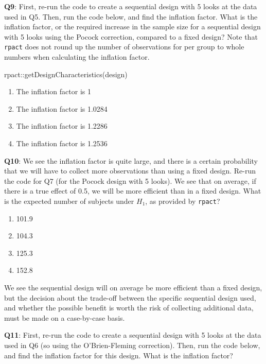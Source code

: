 \documentclass[
  oneside]{book}
\newenvironment{Shaded}{\begin{snugshade}}{\end{snugshade}}
\newcommand{\FunctionTok}[1]{\textcolor[rgb]{0.00,0.00,0.00}{#1}}
\newcommand{\NormalTok}[1]{#1}
\newcommand{\SpecialCharTok}[1]{\textcolor[rgb]{0.00,0.00,0.00}{#1}}
\providecommand{\tightlist}{%
  \setlength{\itemsep}{0pt}\setlength{\parskip}{0pt}}
\begin{document}
\textbf{Q9}: First, re-run the code to create a sequential design with 5 looks at the data used in Q5. Then, run the code below, and find the inflation factor. What is the inflation factor, or the required increase in the sample size for a sequential design with 5 looks using the Pocock correction, compared to a fixed design? Note that \texttt{rpact} does not round up the number of observations for per group to whole numbers when calculating the inflation factor.

\begin{Shaded}
\begin{Highlighting}[]
\NormalTok{rpact}\SpecialCharTok{::}\FunctionTok{getDesignCharacteristics}\NormalTok{(design)}
\end{Highlighting}
\end{Shaded}

\begin{enumerate}
\def\labelenumi{\Alph{enumi})}
\tightlist
\item
  The inflation factor is 1
\item
  The inflation factor is 1.0284
\item
  The inflation factor is 1.2286
\item
  The inflation factor is 1.2536
\end{enumerate}

\textbf{Q10}: We see the inflation factor is quite large, and there is a certain probability that we will have to collect more observations than using a fixed design. Re-run the code for Q7 (for the Pocock design with 5 looks). We see that on average, if there is a true effect of 0.5, we will be more efficient than in a fixed design. What is the expected number of subjects under \(H_1\), as provided by \texttt{rpact}?

\begin{enumerate}
\def\labelenumi{\Alph{enumi})}
\tightlist
\item
  101.9
\item
  104.3
\item
  125.3
\item
  152.8
\end{enumerate}

We see the sequential design will on average be more efficient than a fixed design, but the decision about the trade-off between the specific sequential design used, and whether the possible benefit is worth the risk of collecting additional data, must be made on a case-by-case basis.

\textbf{Q11}: First, re-run the code to create a sequential design with 5 looks at the data used in Q6 (so using the O'Brien-Fleming correction). Then, run the code below, and find the inflation factor for this design. What is the inflation factor?
\end{document}
